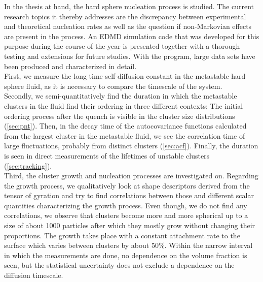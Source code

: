 
\label{sec:conclusion}
In the thesis at hand, the hard sphere nucleation process is studied. The current research topics it thereby addresses are the discrepancy between experimental and theoretical nucleation rates as well as the question if non-Markovian effects are present in the process. An EDMD simulation code that was developed for this purpose during the course of the year is presented together with a thorough testing and extensions for future studies. With the program, large data sets have been produced and characterized in detail.\\

First, we measure the long time self-diffusion constant in the metastable hard sphere fluid, as it is necessary to compare the timescale of the system.\\

Secondly, we semi-quantitatively find the duration in which the metastable
clusters in the fluid find their ordering in three different contexts: The initial ordering process after the quench is visible in the cluster size distributions (\autoref{sec:pnt}). Then, in the decay time of the autocovariance functions calculated from the largest cluster in the metastable fluid, we see the correlation time of large fluctuations, probably from distinct clusters (\autoref{sec:acf}). Finally, the duration is seen in direct measurements of the lifetimes of unstable clusters (\autoref{sec:tracking}).\\

Third, the cluster growth and nucleation processes are investigated on. Regarding the growth process, we qualitatively look at shape descriptors derived from the tensor of gyration and try to find correlations between those and different scalar quantities characterizing the growth process. Even though, we do not find any correlations, we observe that clusters become more and more spherical up to a size of about 1000 particles after which they mostly grow without changing their proportions. The growth takes place with a constant attachment rate to the surface which varies between clusters by about 50\%. Within the narrow interval in which the measurements are done, no dependence on the volume fraction is seen, but the statistical uncertainty does not exclude a dependence on the diffusion timescale.\\

